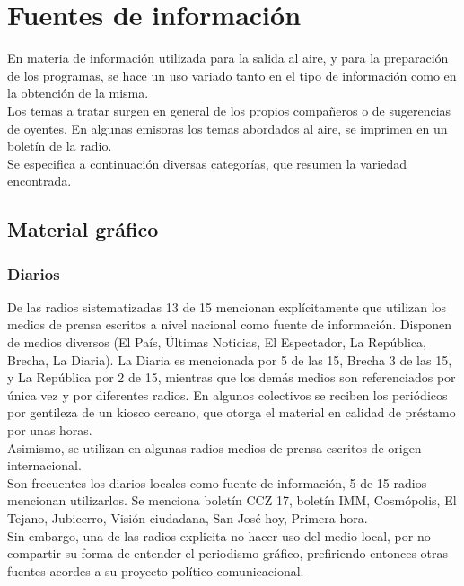 \chapter{Fuentes de información}

En materia de información utilizada para la salida al aire, y para la preparación de los programas, se hace un uso variado tanto en el tipo de información como en la obtención de la misma.\\

Los temas a tratar surgen en general de los propios compañeros o de sugerencias de oyentes. En algunas emisoras los temas abordados al aire, se imprimen en un boletín de la radio.\\

Se especifica a continuación diversas categorías, que resumen la variedad encontrada.\\

\section{Material gráfico}

\subsection{Diarios}

De las radios sistematizadas 13 de 15 mencionan explícitamente que utilizan los medios de prensa escritos a nivel nacional como fuente de información. Disponen de medios diversos (El País, Últimas Noticias, El Espectador, La República, Brecha, La Diaria). La Diaria es mencionada por 5 de las 15, Brecha 3 de las 15, y La República por 2 de 15, mientras que los demás medios son referenciados por única vez y por diferentes radios. En algunos colectivos se reciben los periódicos por gentileza de un kiosco cercano, que otorga el material en calidad de préstamo por unas horas.\\

Asimismo, se utilizan en algunas radios medios de prensa escritos de origen internacional.\\

Son frecuentes los diarios locales como fuente de información, 5 de 15 radios mencionan utilizarlos. Se menciona boletín CCZ 17, boletín IMM, Cosmópolis, El Tejano, Jubicerro, Visión ciudadana, San José hoy, Primera hora.\\

Sin embargo, una de las radios explicita no hacer uso del medio local, por no compartir su forma de entender el periodismo gráfico, prefiriendo entonces otras fuentes acordes a su proyecto político-comunicacional.\\

